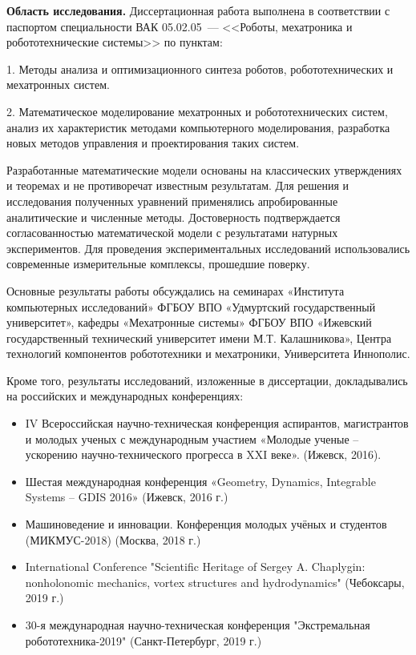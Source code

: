 \textbf{Область исследования.} Диссертационная работа выполнена в соответствии с паспортом специальности ВАК 05.02.05~--- <<Роботы, мехатроника и робототехнические системы>> по пунктам: 

1. Методы анализа и оптимизационного синтеза роботов, робототехнических и мехатронных систем. 

2. Математическое моделирование мехатронных и робототехнических систем, анализ их характеристик методами компьютерного моделирования, разработка новых методов управления и проектирования таких систем.

{\reliability} Разработанные математические модели основаны на классических утверждениях и теоремах и не противоречат известным результатам. Для решения и исследования полученных уравнений применялись апробированные аналитические и численные методы. Достоверность подтверждается согласованностью математической модели с результатами натурных экспериментов. Для проведения экспериментальных исследований использовались современные измерительные комплексы, прошедшие поверку.


{\probation}
Основные результаты работы обсуждались на семинарах «Института компьютерных исследований» ФГБОУ ВПО «Удмуртский государственный университет», кафедры «Мехатронные системы» ФГБОУ ВПО «Ижевский государственный технический университет имени М.Т. Калашникова», Центра технологий компонентов робототехники и мехатроники, Университета Иннополис.

Кроме того, результаты исследований, изложенные в диссертации, докладывались на российских и международных конференциях:
\begin{itemize}
	\item IV Всероссийская научно-техническая конференция аспирантов, магистрантов и молодых ученых с международным участием «Молодые ученые -- ускорению научно-технического прогресса в XXI веке». (Ижевск, 2016).
	\item Шестая международная конференция «Geometry, Dynamics, Integrable Systems -- GDIS 2016» (Ижевск, 2016 г.)
	\item Машиноведение и инновации. Конференция молодых учёных и студентов (МИКМУС-2018) (Москва, 2018 г.)
	\item International Conference "Scientific Heritage of Sergey A. Chaplygin: nonholonomic mechanics, vortex structures and hydrodynamics" (Чебоксары, 2019 г.)
	\item 30-я международная научно-техническая конференция "Экстремальная робототехника-2019" (Санкт-Петербург, 2019 г.)	
\end{itemize}


